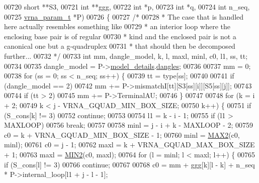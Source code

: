 \begin{DoxyCode}
00720                                       \textcolor{keywordtype}{short}         **S3,
00721                                       \textcolor{keywordtype}{int}           **ggg,
00722                                       \textcolor{keywordtype}{int}           *p,
00723                                       \textcolor{keywordtype}{int}           *q,
00724                                       \textcolor{keywordtype}{int}           n\_seq,
00725                                       \hyperlink{group__energy__parameters_structvrna__param__s}{vrna\_param\_t}  *P)
00726 \{
00727   \textcolor{comment}{/*}
00728 \textcolor{comment}{   * The case that is handled here actually resembles something like}
00729 \textcolor{comment}{   * an interior loop where the enclosing base pair is of regular}
00730 \textcolor{comment}{   * kind and the enclosed pair is not a canonical one but a g-quadruplex}
00731 \textcolor{comment}{   * that should then be decomposed further...}
00732 \textcolor{comment}{   */}
00733   \textcolor{keywordtype}{int} mm, dangle\_model, k, l, maxl, minl, c0, l1, ss, tt;
00734 
00735   dangle\_model = P->\hyperlink{group__energy__parameters_a7b84353eb9075c595bad4ceb871bcae7}{model\_details}.\hyperlink{group__model__details_adcda4ff2ea77748ae0e8700288282efc}{dangles};
00736 
00737   mm = 0;
00738   \textcolor{keywordflow}{for} (ss = 0; ss < n\_seq; ss++) \{
00739     tt = type[ss];
00740 
00741     \textcolor{keywordflow}{if} (dangle\_model == 2)
00742       mm += P->mismatchI[tt][S3[ss][i]][S5[ss][j]];
00743 
00744     \textcolor{keywordflow}{if} (tt > 2)
00745       mm += P->TerminalAU;
00746   \}
00747 
00748   \textcolor{keywordflow}{for} (k = i + 2;
00749        k < j - VRNA\_GQUAD\_MIN\_BOX\_SIZE;
00750        k++) \{
00751     \textcolor{keywordflow}{if} (S\_cons[k] != 3)
00752       \textcolor{keywordflow}{continue};
00753 
00754     l1 = k - i - 1;
00755     \textcolor{keywordflow}{if} (l1 > MAXLOOP)
00756       \textcolor{keywordflow}{break};
00757 
00758     minl  = j - i + k - MAXLOOP - 2;
00759     c0    = k + VRNA\_GQUAD\_MIN\_BOX\_SIZE - 1;
00760     minl  = \hyperlink{group__utils_ga33297b3679c713b0c4d897cd0fe3b122}{MAX2}(c0, minl);
00761     c0    = j - 1;
00762     maxl  = k + VRNA\_GQUAD\_MAX\_BOX\_SIZE + 1;
00763     maxl  = \hyperlink{group__utils_gae0b9cd0ce090bd69b951aa73e8fa4f7d}{MIN2}(c0, maxl);
00764     \textcolor{keywordflow}{for} (l = minl; l < maxl; l++) \{
00765       \textcolor{keywordflow}{if} (S\_cons[l] != 3)
00766         \textcolor{keywordflow}{continue};
00767 
00768       c0 = mm + ggg[k][l - k] + n\_seq * P->internal\_loop[l1 + j - l - 1];

\end{DoxyCode}
